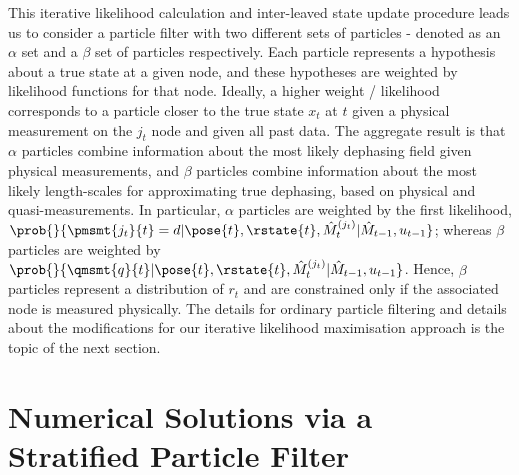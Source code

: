 This iterative likelihood calculation and inter-leaved state update procedure leads us to consider a particle filter with two different sets of particles - denoted as an $\alpha$ set and a $\beta$ set of particles respectively. Each particle represents a hypothesis about a true state at a given node, and these hypotheses are weighted by likelihood functions for that node. Ideally, a higher weight / likelihood corresponds to a particle closer to the true state $x_t$ at $t$ given a physical measurement on the $j_t$ node and given all past data.  The aggregate result is that $\alpha$ particles combine information about the most likely dephasing field given physical measurements, and $\beta$ particles combine information about the most likely length-scales for approximating true dephasing, based on physical and quasi-measurements. In particular, $\alpha$ particles are weighted by the first likelihood, $\prob{}{\pmsmt{j_t}{t}=d | \pose{t}, \rstate{t}, \hat{M}_t^{(j_t)}| \hat{M}_{t-1}, u_{t-1}}$; whereas $\beta$ particles are weighted by $\prob{}{ \qmsmt{q}{t}|\pose{t}, \rstate{t}, \hat{M}_t^{(j_t)}| \hat{M}_{t-1}, u_{t-1 }}$. Hence, $\beta$ particles represent a distribution of $r_t$ and are constrained only if the associated node is measured physically. The details for ordinary particle filtering and details about the modifications for our iterative likelihood maximisation approach is the topic of the next section.

\section{Numerical Solutions via a Stratified Particle Filter} \label{sec:particlefilter}

